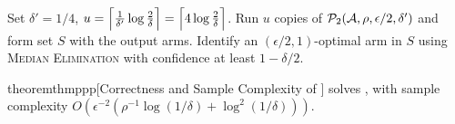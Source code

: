 \begin{algorithm}[ht]
\begin{algorithmic}
\small{
 \STATE Set $\delta' = 1/4$, $u = \Big\lceil\frac{1}{\delta'}\log\frac{2}{\delta}\Big\rceil = \Big\lceil4\log\frac{2}{\delta}\Big\rceil$.
 \STATE Run $u$ copies of $\mathcal{P}_2(\mathcal{A}, \rho, \epsilon/2, \delta')$ and form set $S$ with the output arms.
 \STATE Identify an $(\epsilon/2,1)$-optimal arm in $S$ using \textsc{Median Elimination} with confidence at least $1-\delta/2$.
 }
 \end{algorithmic}
 \caption{$\mathcal{P}_3$}
\label{alg:tightqp1}
 \end{algorithm}



 \begin{restatable}{theorem}{thmppp}[Correctness and Sample Complexity of \PPP]
 \label{thm:ppp}
 \PPP  solves \QP, with sample complexity 
$O(\epsilon^{-2}(\rho^{-1}\log(1/\delta) + \log^2(1/\delta)))$.
 \end{restatable}
